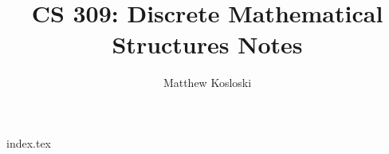 \documentclass[12pt]{report}
\title{CS 309: Discrete Mathematical Structures Notes}
\author{Matthew Kosloski}
\date{ }
\begin{document}
{index.tex}
\end{document}
